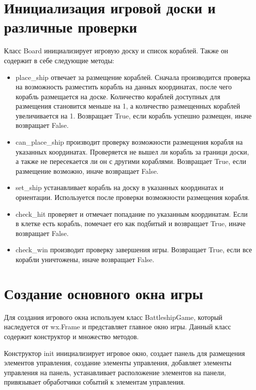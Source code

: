 \section{\label{sec:ch02/sec04}Инициализация игровой доски и различные проверки}
Класс Board инициализирует игровую доску и список кораблей.
Также он содержит в себе следующие методы:
\begin{itemize}
    \item place\_ship отвечает за размещение кораблей. Сначала производится проверка на возможность разместить корабль на данных координатах, после чего корабль размещается на доске. Количество кораблей доступных для размещения становится меньше на 1, а количество размещенных кораблей увеличивается на 1. Возвращает True, если корабль успешно размещен, иначе возвращает False.
    \item can\_place\_ship производит проверку возможности размещения корабля на указанных координатах. Проверяется не вышел ли корабль за граници доски, а также не пересекается ли он с другими кораблями. Возвращает True, если размещение возможно, иначе возвращает False.
    \item set\_ship устанавливает корабль на доску в указанных координатах и ориентации. Используется после проверки возможности размещения корабля.
    \item check\_hit проверяет и отмечает попадание по указанным координатам. Если в клетке есть корабль, помечает его как подбитый и возвращает True, иначе возвращает False.
    \item check\_win производит проверку завершения игры. Возвращает True, если все корабли уничтожены, иначе возвращает False.
\end{itemize}
\section{\label{sec:ch02/sec05}Создание основного окна игры}
Для создания игрового окна используем класс BattleshipGame, который наследуется от wx.Frame и представляет главное окно игры. Данный класс содержит конструктор и множество методов.

Конструктор init инициализирует игровое окно, создает панель для размещения элементов управления, создание элементы управления, добавляет элементы управления на панель, устанавливает расположение элементов на панели, привязывает обработчики событий к элементам управления.

